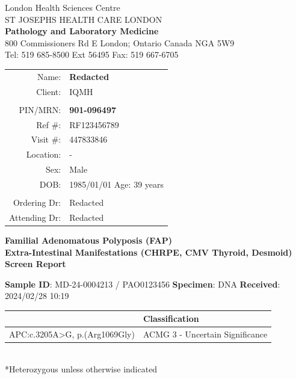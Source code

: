 \documentclass[9pt]{extarticle}
\begin{document}
\parbox[b][][]{.42\textwidth}{
\centering
London Health Sciences Centre\\
ST JOSEPHS HEALTH CARE LONDON \\
\vspace{1em}
{\bf Pathology and Laboratory Medicine}\\ 
\vspace{1em}
800 Commissioners Rd E London; Ontario Canada NGA 5W9 \\
Tel: 519 685-8500 Ext 56495 Fax: 519 667-6705
}
\hfill
\parbox{.55\textwidth}{
\large
\begin{tabular}{r l}
Name: & {\bf Redacted}\\
Client:  & IQMH\\
& \\
PIN/MRN:  & {\bf 901-096497} \\
Ref \#: &  RF123456789 \\
Visit \#: &  447833846 \\
Location: &  -\\
Sex: & Male \\
DOB:  & 1985/01/01 \hspace{1ex} Age:\hspace{1ex} 39 years \\
& \\
Ordering Dr:  & Redacted \\
Attending Dr:  & Redacted\\
\end{tabular}
}


\vspace{1ex}
\begin{center}
\Large \bf
Familial Adenomatous Polyposis (FAP)\\
Extra-Intestinal Manifestations (CHRPE, CMV Thyroid, Desmoid) Screen Report
\end{center}
\vspace{1ex}

{\bf Sample ID}: MD-24-0004213 / PAO0123456 \hspace{2em} {\bf Specimen}: DNA \hspace{2em} {\bf Received}: 2024/02/28 10:19\\
\begin{tabular}{ | >{\centering\arraybackslash}p{9cm} | >{\centering\arraybackslash}p{9cm} | }
\hline
{\large \bf Variant*} & {\large \bf Classification} \\ \hline
APC:c.3205A>G, p.(Arg1069Gly) & ACMG 3 - Uncertain Significance \\ \hline
\end{tabular}
\\ *Heterozygous unless otherwise indicated
\end{document}

